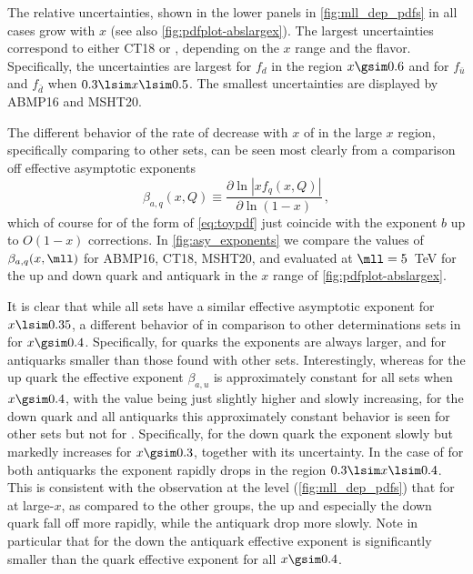 The relative \pdfs uncertainties, shown in the lower panels in
\cref{fig:mll_dep_pdfs} in all cases grow with $x$ (see also 
\cref{fig:pdfplot-abslargex}).
%
The largest \pdf uncertainties correspond to either CT18 or , 
depending on the $x$ range and the \pdf flavor.
%
Specifically, the  uncertainties are largest for $f_d$ in the
region $x\gsim 0.6$ 
and for $f_{\bar{u}}$ and $f_{\bar{d}}$ when $0.3 \lsim x \lsim 0.5$.
%
The smallest \pdf uncertainties are displayed by ABMP16 and  MSHT20.

The different behavior of the rate of decrease with $x$ of
\pdfs  in the large $x$ region, specifically comparing 
to other \pdf sets, can  be seen most clearly from a comparison off
effective asymptotic exponents~\cite{Ball:2016spl}
\begin{equation}
  \beta_{a,q}(x,Q)\equiv\frac{\partial \ln|xf_q(x,Q)|}{\partial \ln(1-x)}\,,
  \label{eq:beta_asy}
\end{equation}
which of course for \pdfs of the form of \cref{eq:toypdf} just
coincide with the exponent $b$ up to $O(1-x)$ corrections.
In \cref{fig:asy_exponents} we compare
the values of $\beta_{a,q}(x,\mll)$
for ABMP16, CT18, MSHT20, and  evaluated at $\mll=5$~TeV
for the up and down quark and antiquark \pdfs in the  $x$ range of
\cref{fig:pdfplot-abslargex}.

It is clear that while all \pdf
sets have a similar effective asymptotic exponent for $x\lsim 0.35$, a
different behavior of  in comparison to other
determinations sets in for $x\gsim 0.4$.
%
Specifically, for quarks the  exponents are always larger,
and for antiquarks smaller than those found with other \pdf
sets.
%
Interestingly, whereas for the up quark the
effective exponent $\beta_{a,u}$ is approximately constant for all
\pdf sets when  $x\gsim 0.4$, with the  value being just
slightly higher and slowly increasing, for the down quark and all
antiquarks this approximately constant behavior is seen for other
\pdf sets but not for .
%
Specifically, for the  down quark
the exponent slowly but markedly increases for $x\gsim 0.3$, together 
with its uncertainty.
%
In the case of  for both antiquarks the exponent
rapidly drops  in the region $0.3 \lsim x \lsim 0.4$.
%
This is consistent with the observation at the \pdf level
(\cref{fig:mll_dep_pdfs})  that for 
at large-$x$, as compared to the other groups,
the up and especially the down  quark fall off more rapidly, while
the antiquark \pdfs drop more slowly. Note in particular that for
the down \pdf the antiquark effective exponent is significantly
smaller than the quark effective exponent for all $x\gsim0.4$.

